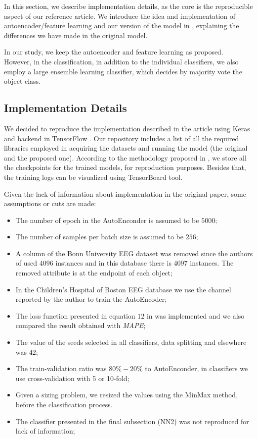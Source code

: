 In this section, we describe implementation details, as the core is the reproducible aspect of our reference article. We introduce the idea and implementation of autoencoder/feature learning and our version of the model in \cite{WenZha:2018}, explaining the differences we have made in the original model.

In our study, we keep the autoencoder and feature learning as proposed. However, in the classification, in addition to the individual classifiers, we also employ a large ensemble learning classifier, which decides by majority vote the object class.

\subsection{Implementation Details}\label{subsec:implementation}

We decided to reproduce the implementation described in the article using Keras \cite{chollet2018keras} and backend in TensorFlow \cite{tensorflow}. Our repository includes a list of all the required libraries employed in acquiring the datasets and running the model (the original and the proposed one). According to the methodology proposed in \cite{Fuente:2019}, we store all the checkpoints for the trained models, for reproduction purposes. Besides that, the training logs can be visualized using TensorBoard tool.

Given the lack of information about implementation in the original paper, some assumptions or cuts are made: 

\begin{itemize}
\item The number of epoch in the AutoEnconder is assumed to be $5000$; 
\item The number of samples per batch size is assumed to be $256$; 
\item A column of the Bonn University EEG dataset was removed since the authors of \cite{WenZha:2018} used $4096$ instances and in this database there is $4097$ instances. The removed attribute is at the endpoint of each object; 
\item In the Children's Hospital of Boston EEG database we use the channel reported by the author to train the AutoEncoder;
\item The loss function presented in equation $12$ in \cite{WenZha:2018} was implemented and we also compared the result obtained with \textit{MAPE}; 
\item The value of the seeds selected in all classifiers, data splitting and elsewhere was $42$; 
\item The train-validation ratio was $80\%-20\%$ to AutoEnconder, in classifiers we use cross-validation with 5 or 10-fold; 
\item Given a sizing problem, we resized the values using the MinMax method, before the classification process.
\item The classifier presented in the final subsection (NN2) was not reproduced for lack of information; 
\end{itemize}

